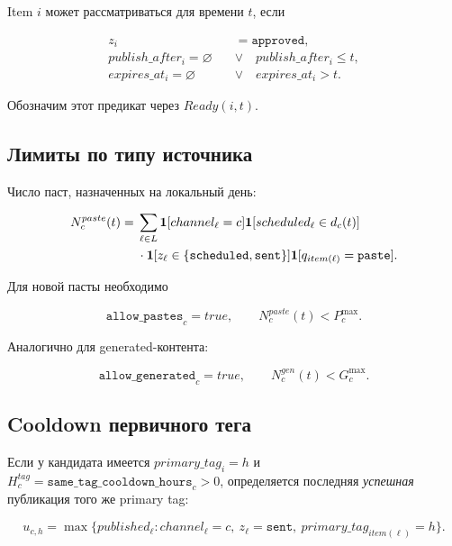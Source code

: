 \documentclass[12pt,a4paper]{article}
\newcommand{\Ind}{\mathbf{1}}
\newcommand{\Empty}{\varnothing}
\newcommand{\Status}[1]{\texttt{#1}}
\newcommand{\Field}[1]{\texttt{#1}}
\newcommand{\Source}[1]{\texttt{#1}}
\begin{document}
Item $i$ может рассматриваться для времени $t$, если

\begin{align}
  z_i&=\Status{approved},\\
  publish\_after_i=\Empty\quad&\lor\quad publish\_after_i\leq t,\\
  expires\_at_i=\Empty\quad&\lor\quad expires\_at_i>t.
\end{align}

Обозначим этот предикат через $Ready(i,t)$.

\subsection{Лимиты по типу источника}

Число паст, назначенных на локальный день:

\begin{align}
  N_c^{paste}(t)={}&
  \sum_{\ell\in L}
  \Ind[channel_\ell=c]
  \Ind[scheduled_\ell\in d_c(t)]\notag\\
  &\cdot\Ind[z_\ell\in\{\Status{scheduled},\Status{sent}\}]
  \Ind[q_{item(\ell)}=\Source{paste}].
\end{align}

Для новой пасты необходимо

\begin{equation}
  \Field{allow\_pastes}_c=true,
  \qquad
  N_c^{paste}(t)<P_c^{\max}.
  \label{eq:paste-day-limit}
\end{equation}

Аналогично для generated-контента:

\begin{equation}
  \Field{allow\_generated}_c=true,
  \qquad
  N_c^{gen}(t)<G_c^{\max}.
  \label{eq:generated-day-limit}
\end{equation}

\subsection{Cooldown первичного тега}

Если у кандидата имеется $primary\_tag_i=h$ и
$H_c^{tag}=\Field{same\_tag\_cooldown\_hours}_c>0$, определяется последняя
\emph{успешная} публикация того же primary tag:

\begin{equation}
  u_{c,h}=\max\{published_\ell:
  channel_\ell=c,\ z_\ell=\Status{sent},\ primary\_tag_{item(\ell)}=h\}.
\end{equation}
\end{document}
